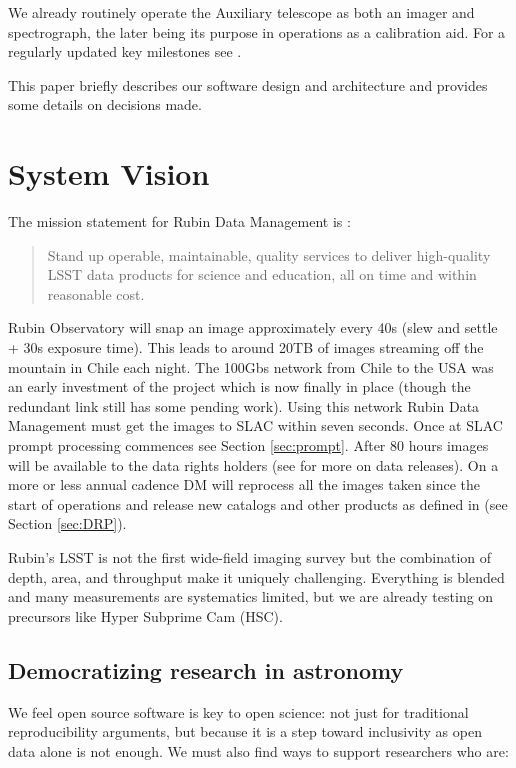 \documentclass[11pt,twoside]{article}
\begin{document}
We already routinely operate the Auxiliary telescope as both an imager and spectrograph, the later being its purpose in operations as a calibration aid. For a regularly updated key milestones see \citep{DMTN-232}.

This paper briefly describes our software design and architecture and provides some details on decisions made.

\section{System Vision}
The mission statement for Rubin Data Management is :
\begin{quote}
Stand up operable, maintainable, quality services to deliver high-quality LSST data products for science and education, all on time and within reasonable cost.

\end{quote}

Rubin Observatory will snap an image approximately every 40s (slew and settle + 30s exposure time).
This leads to around 20TB of images streaming off the mountain in Chile each night.
The 100Gbs network from Chile to the USA was an early investment of the project which is now finally in place (though the redundant link still has some pending work).
Using this network Rubin Data Management must get the images to SLAC within seven seconds.
Once at SLAC prompt processing commences see Section \ref{sec:prompt}.
After 80 hours images will be available to the data rights holders (see \citep{RDO-011} for more on data releases).
On a more or less annual cadence DM will reprocess all the images taken since the start of operations and release new catalogs and other products as defined in \citet{LSE-163} (see Section \ref{sec:DRP}).

Rubin’s LSST is not the first wide-field imaging survey but the combination of depth, area, and throughput make it uniquely challenging.
Everything is blended and many measurements are systematics limited, but
we are already testing  on precursors like Hyper Subprime Cam (HSC).


\subsection{Democratizing research in astronomy}

We feel open source software is key to open science: not just for traditional reproducibility arguments, but because it is a step toward inclusivity as
open data alone is not enough.
We must also find ways to support researchers who are:
\end{document}
